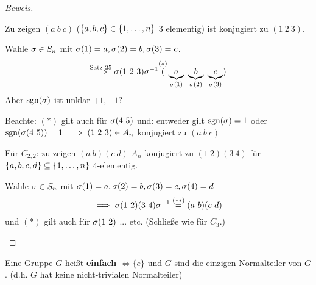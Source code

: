 \documentclass[a4paper]{report}
\begin{document}
\begin{proof}[Beweis]
\begin{enumerate}[(a)]
        Zu zeigen $(a\ b\ c)$ ($\{a, b, c\} \in \{1, \ldots, n\}$ 3 elementig) ist konjugiert zu  $(1\ 2\ 3)$.

        Wahle $\sigma \in S_n$ mit $\sigma(1)=a, \sigma(2)=b, \sigma(3)=c$.
        \[\overset{\text{Satz 25}}\imp \s(1\ 2\ 3)\s^{-1} \overset{(*)} (\underbrace a_{{\s(1)}}\ \underbrace b_{{\s(2)}}\ \underbrace c_{{\s(3)}})\]
        Aber $\operatorname{sgn}(\sigma)$ ist unklar $+1, -1?$

        Beachte: $(*)$ gilt auch für $\sigma(4\ 5)$ und: entweder gilt $\operatorname{sgn}(\sigma) = 1$ oder $\operatorname{sgn}(\sigma(4\ 5)) = 1$
        \(\implies (1\ 2\ 3) \in A_{n}\) konjugiert zu $(a\ b\ c)$

        Für $C_{2, 2}$: zu zeigen $(a\ b)(c\ d)$ $A_{n}$-konjugiert zu $(1\ 2)(3\ 4)$ für $\{a, b, c, d\} \subseteq \{1, \ldots, n\}$ 4-elementig.

        Wähle $\sigma \in S_n$ mit $\sigma(1)=a, \sigma(2)=b, \sigma(3)=c, \sigma(4)=d$
        \[\imp \s (1\ 2)(3\ 4)\s^{-1} \overset{(**)}= (a\ b)(c\ d)\]
        und $(*)$ gilt auch für $\sigma(1\ 2)$ ... etc. (Schließe wie für $C_{3}$.)
\end{enumerate}
\end{proof}

\begin{defi}
  Eine Gruppe $G$ heißt \textbf{einfach} $\iff \{e\}$ und $G$ sind die einzigen Normalteiler von $G$. (d.h. $G$ hat keine nicht-trivialen Normalteiler)
\end{defi}
\end{document}
